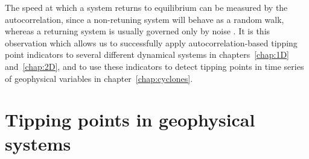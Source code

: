 The speed at which a system returns to equilibrium can be measured by the autocorrelation, since a non-retuning system will behave as a random walk, whereas a returning system is usually governed only by noise \citep{scheffer2009}. It is this observation which allows us to successfully apply autocorrelation-based tipping point indicators to several different dynamical systems in chapters~\ref{chap:1D} and~\ref{chap:2D}, and to use these indicators to detect tipping points in time series of geophysical variables in chapter~\ref{chap:cyclones}.





\section{Tipping points in geophysical systems}
\label{sec:intro:geophysical}
